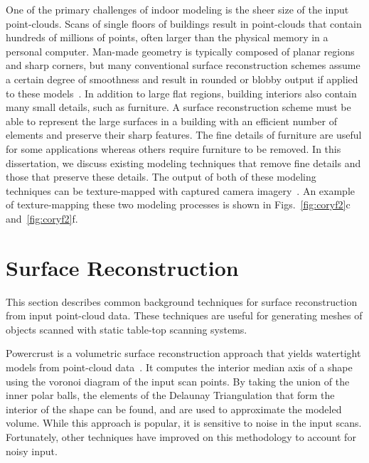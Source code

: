 \documentclass[12pt,onecolumn,oneside]{book}
\begin{document}
One of the primary challenges of indoor modeling is the sheer size of the input point-clouds.  Scans of single floors of buildings result in point-clouds that contain hundreds of millions of points, often larger than the physical memory in a personal computer.  Man-made geometry is typically composed of planar regions and sharp corners, but many conventional surface reconstruction schemes assume a certain degree of smoothness and result in rounded or blobby output if applied to these models~\cite{Powercrust,OctreeSculpting,Carving,ProgressiveMesh,Poisson,EigencrustShewchuk}.  In addition to large flat regions, building interiors also contain many small details, such as furniture.  A surface reconstruction scheme must be able to represent the large surfaces in a building with an efficient number of elements and preserve their sharp features.  The fine details of furniture are useful for some applications whereas others require furniture to be removed.  In this dissertation, we discuss existing modeling techniques that remove fine details and those that preserve these details.  The output of both of these modeling techniques can be texture-mapped with captured camera imagery~\cite{Cheng14}.  An example of texture-mapping these two modeling processes is shown in Figs.~\ref{fig:coryf2}c and~\ref{fig:coryf2}f.

\section{Surface Reconstruction}
\label{sec:surf_recon_background}

This section describes common background techniques for surface reconstruction from input point-cloud data.  These techniques are useful for generating meshes of objects scanned with static table-top scanning systems.

Powercrust is a volumetric surface reconstruction approach that yields watertight models from point-cloud data~\cite{Powercrust}.  It computes the interior median axis of a shape using the voronoi diagram of the input scan points.  By taking the union of the inner polar balls, the elements of the Delaunay Triangulation that form the interior of the shape can be found, and are used to approximate the modeled volume.  While this approach is popular, it is sensitive to noise in the input scans.  Fortunately, other techniques have improved on this methodology to account for noisy input.
\end{document}
